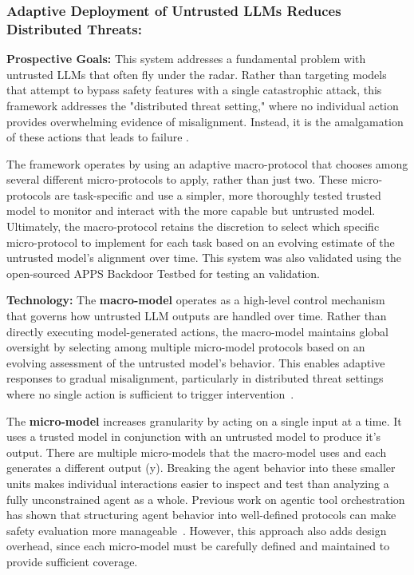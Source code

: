 \documentclass[conference]{IEEEtran}
\begin{document}
\subsubsection{Adaptive Deployment of Untrusted LLMs Reduces Distributed Threats:}

\textbf{Prospective Goals:} This system addresses a fundamental problem with untrusted LLMs that often fly under the radar. Rather than targeting models that attempt to bypass safety features with a single catastrophic attack, this framework addresses the "distributed threat setting," where no individual action provides overwhelming evidence of misalignment. Instead, it is the amalgamation of these actions that leads to failure \cite{wen2024adaptivedeploymentuntrustedllms}.

The framework operates by using an adaptive macro-protocol that chooses among several different micro-protocols to apply, rather than just two. These micro-protocols are task-specific and use a simpler, more thoroughly tested trusted model to monitor and interact with the more capable but untrusted model. Ultimately, the macro-protocol retains the discretion to select which specific micro-protocol to implement for each task based on an evolving estimate of the untrusted model’s alignment over time. This system was also validated using the open-sourced APPS Backdoor Testbed for testing an validation.


\textbf{Technology:}
The \textbf{macro-model} operates as a high-level control mechanism that governs how untrusted LLM outputs are handled over time. Rather than directly executing model-generated actions, the macro-model maintains global oversight by selecting among multiple micro-model protocols based on an evolving assessment of the untrusted model’s behavior. This enables adaptive responses to gradual misalignment, particularly in distributed threat settings where no single action is sufficient to trigger intervention~\cite{wen2024adaptivedeploymentuntrustedllms}.


The \textbf{micro-model} increases granularity by acting on a single input at a time. It uses a trusted model in conjunction with an untrusted model to produce it's output. There are multiple micro-models that the macro-model uses and each generates a different output (y). 
Breaking the agent behavior into these smaller units makes individual interactions easier to inspect and test than analyzing a fully unconstrained agent as a whole. Previous work on agentic tool orchestration has shown that structuring agent behavior into well-defined protocols can make safety evaluation more manageable~\cite{chen2025agentguardsafetytoolorchestration, yao2023react}. However, this approach also adds design overhead, since each micro-model must be carefully defined and maintained to provide sufficient coverage.
\end{document}
